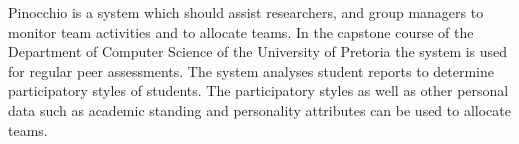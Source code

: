 Pinocchio is a system which should assist researchers, and group managers to monitor team activities and to allocate teams. In the capstone course of the Department of Computer Science of the University of Pretoria the system is used for regular peer assessments. The system analyses student  reports to determine participatory styles of students. The participatory styles as well as other personal data such as academic standing and personality attributes can be used to allocate teams.  
